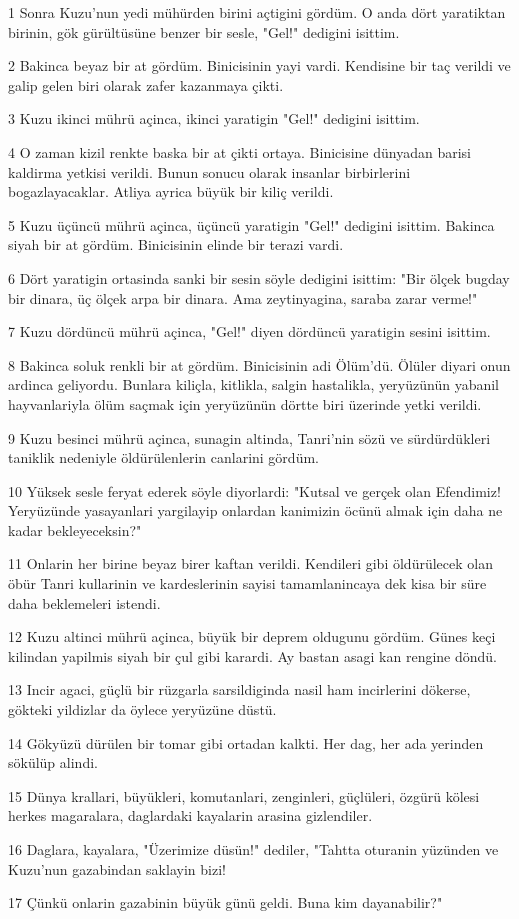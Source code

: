 \par 1 Sonra Kuzu'nun yedi mühürden birini açtigini gördüm. O anda dört yaratiktan birinin, gök gürültüsüne benzer bir sesle, "Gel!" dedigini isittim.
\par 2 Bakinca beyaz bir at gördüm. Binicisinin yayi vardi. Kendisine bir taç verildi ve galip gelen biri olarak zafer kazanmaya çikti.
\par 3 Kuzu ikinci mührü açinca, ikinci yaratigin "Gel!" dedigini isittim.
\par 4 O zaman kizil renkte baska bir at çikti ortaya. Binicisine dünyadan barisi kaldirma yetkisi verildi. Bunun sonucu olarak insanlar birbirlerini bogazlayacaklar. Atliya ayrica büyük bir kiliç verildi.
\par 5 Kuzu üçüncü mührü açinca, üçüncü yaratigin "Gel!" dedigini isittim. Bakinca siyah bir at gördüm. Binicisinin elinde bir terazi vardi.
\par 6 Dört yaratigin ortasinda sanki bir sesin söyle dedigini isittim: "Bir ölçek bugday bir dinara, üç ölçek arpa bir dinara. Ama zeytinyagina, saraba zarar verme!"
\par 7 Kuzu dördüncü mührü açinca, "Gel!" diyen dördüncü yaratigin sesini isittim.
\par 8 Bakinca soluk renkli bir at gördüm. Binicisinin adi Ölüm'dü. Ölüler diyari onun ardinca geliyordu. Bunlara kiliçla, kitlikla, salgin hastalikla, yeryüzünün yabanil hayvanlariyla ölüm saçmak için yeryüzünün dörtte biri üzerinde yetki verildi.
\par 9 Kuzu besinci mührü açinca, sunagin altinda, Tanri'nin sözü ve sürdürdükleri taniklik nedeniyle öldürülenlerin canlarini gördüm.
\par 10 Yüksek sesle feryat ederek söyle diyorlardi: "Kutsal ve gerçek olan Efendimiz! Yeryüzünde yasayanlari yargilayip onlardan kanimizin öcünü almak için daha ne kadar bekleyeceksin?"
\par 11 Onlarin her birine beyaz birer kaftan verildi. Kendileri gibi öldürülecek olan öbür Tanri kullarinin ve kardeslerinin sayisi tamamlanincaya dek kisa bir süre daha beklemeleri istendi.
\par 12 Kuzu altinci mührü açinca, büyük bir deprem oldugunu gördüm. Günes keçi kilindan yapilmis siyah bir çul gibi karardi. Ay bastan asagi kan rengine döndü.
\par 13 Incir agaci, güçlü bir rüzgarla sarsildiginda nasil ham incirlerini dökerse, gökteki yildizlar da öylece yeryüzüne düstü.
\par 14 Gökyüzü dürülen bir tomar gibi ortadan kalkti. Her dag, her ada yerinden sökülüp alindi.
\par 15 Dünya krallari, büyükleri, komutanlari, zenginleri, güçlüleri, özgürü kölesi herkes magaralara, daglardaki kayalarin arasina gizlendiler.
\par 16 Daglara, kayalara, "Üzerimize düsün!" dediler, "Tahtta oturanin yüzünden ve Kuzu'nun gazabindan saklayin bizi!
\par 17 Çünkü onlarin gazabinin büyük günü geldi. Buna kim dayanabilir?"

